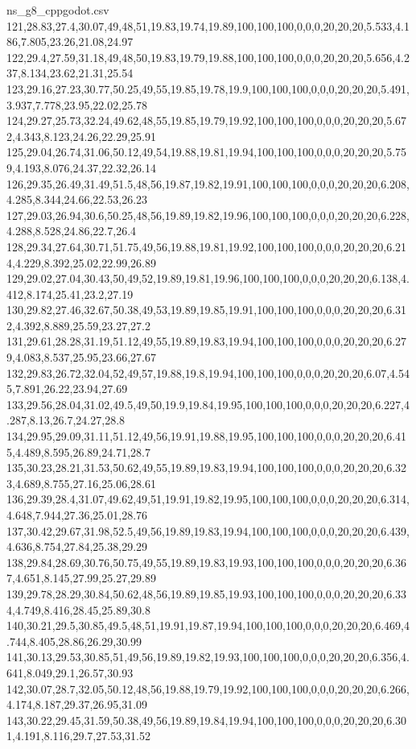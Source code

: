 \begin{filecontents*}[overwrite]{ns_g8_cppgodot.csv}
121,28.83,27.4,30.07,49,48,51,19.83,19.74,19.89,100,100,100,0,0,0,20,20,20,5.533,4.186,7.805,23.26,21.08,24.97
122,29.4,27.59,31.18,49,48,50,19.83,19.79,19.88,100,100,100,0,0,0,20,20,20,5.656,4.237,8.134,23.62,21.31,25.54
123,29.16,27.23,30.77,50.25,49,55,19.85,19.78,19.9,100,100,100,0,0,0,20,20,20,5.491,3.937,7.778,23.95,22.02,25.78
124,29.27,25.73,32.24,49.62,48,55,19.85,19.79,19.92,100,100,100,0,0,0,20,20,20,5.672,4.343,8.123,24.26,22.29,25.91
125,29.04,26.74,31.06,50.12,49,54,19.88,19.81,19.94,100,100,100,0,0,0,20,20,20,5.759,4.193,8.076,24.37,22.32,26.14
126,29.35,26.49,31.49,51.5,48,56,19.87,19.82,19.91,100,100,100,0,0,0,20,20,20,6.208,4.285,8.344,24.66,22.53,26.23
127,29.03,26.94,30.6,50.25,48,56,19.89,19.82,19.96,100,100,100,0,0,0,20,20,20,6.228,4.288,8.528,24.86,22.7,26.4
128,29.34,27.64,30.71,51.75,49,56,19.88,19.81,19.92,100,100,100,0,0,0,20,20,20,6.214,4.229,8.392,25.02,22.99,26.89
129,29.02,27.04,30.43,50,49,52,19.89,19.81,19.96,100,100,100,0,0,0,20,20,20,6.138,4.412,8.174,25.41,23.2,27.19
130,29.82,27.46,32.67,50.38,49,53,19.89,19.85,19.91,100,100,100,0,0,0,20,20,20,6.312,4.392,8.889,25.59,23.27,27.2
131,29.61,28.28,31.19,51.12,49,55,19.89,19.83,19.94,100,100,100,0,0,0,20,20,20,6.279,4.083,8.537,25.95,23.66,27.67
132,29.83,26.72,32.04,52,49,57,19.88,19.8,19.94,100,100,100,0,0,0,20,20,20,6.07,4.545,7.891,26.22,23.94,27.69
133,29.56,28.04,31.02,49.5,49,50,19.9,19.84,19.95,100,100,100,0,0,0,20,20,20,6.227,4.287,8.13,26.7,24.27,28.8
134,29.95,29.09,31.11,51.12,49,56,19.91,19.88,19.95,100,100,100,0,0,0,20,20,20,6.415,4.489,8.595,26.89,24.71,28.7
135,30.23,28.21,31.53,50.62,49,55,19.89,19.83,19.94,100,100,100,0,0,0,20,20,20,6.323,4.689,8.755,27.16,25.06,28.61
136,29.39,28.4,31.07,49.62,49,51,19.91,19.82,19.95,100,100,100,0,0,0,20,20,20,6.314,4.648,7.944,27.36,25.01,28.76
137,30.42,29.67,31.98,52.5,49,56,19.89,19.83,19.94,100,100,100,0,0,0,20,20,20,6.439,4.636,8.754,27.84,25.38,29.29
138,29.84,28.69,30.76,50.75,49,55,19.89,19.83,19.93,100,100,100,0,0,0,20,20,20,6.367,4.651,8.145,27.99,25.27,29.89
139,29.78,28.29,30.84,50.62,48,56,19.89,19.85,19.93,100,100,100,0,0,0,20,20,20,6.334,4.749,8.416,28.45,25.89,30.8
140,30.21,29.5,30.85,49.5,48,51,19.91,19.87,19.94,100,100,100,0,0,0,20,20,20,6.469,4.744,8.405,28.86,26.29,30.99
141,30.13,29.53,30.85,51,49,56,19.89,19.82,19.93,100,100,100,0,0,0,20,20,20,6.356,4.641,8.049,29.1,26.57,30.93
142,30.07,28.7,32.05,50.12,48,56,19.88,19.79,19.92,100,100,100,0,0,0,20,20,20,6.266,4.174,8.187,29.37,26.95,31.09
143,30.22,29.45,31.59,50.38,49,56,19.89,19.84,19.94,100,100,100,0,0,0,20,20,20,6.301,4.191,8.116,29.7,27.53,31.52

\end{filecontents*}
